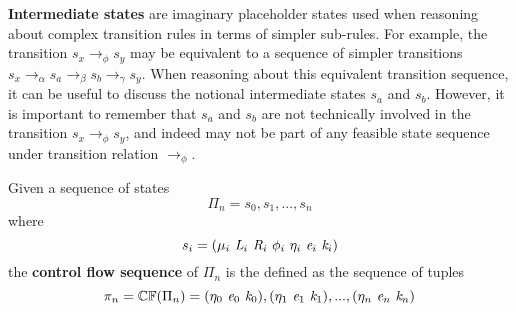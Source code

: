 \begin{definition}
\label{def:interstate}
\textbf{Intermediate states} are imaginary placeholder states used when reasoning about complex transition rules in terms of simpler sub-rules. For example, the transition $s_x \rightarrow_\phi s_y$ may be equivalent to a sequence of simpler transitions $s_x \rightarrow_\alpha s_a \rightarrow_\beta s_b \rightarrow_\gamma s_y$.  When reasoning about this equivalent transition sequence, it can be useful to discuss the notional intermediate states $s_a$ and $s_b$. However, it is important to remember that $s_a$ and $s_b$ are not technically involved in the transition $s_x \rightarrow_\phi s_y$, and indeed may not be part of any feasible state sequence under transition relation $\rightarrow_\phi$.
\end{definition}

\begin{definition}
Given a sequence of states $$\Pi_n = s_0,s_1,...,s_n$$ where $$s_i = ( \mu_i\ \cfgnt{L}_i\ \cfgnt{R}_i\ \phi_i\ \eta_i\ \cfgnt{e}_i\ \cfgnt{k}_i )$$ the \textbf{control flow sequence} of $\Pi_n$ is the defined as the sequence of tuples $$ \pi_n = \mathbb{CF}(\Pi_n) = (\eta_0\ \cfgnt{e}_0\ \cfgnt{k}_0),(\eta_1\ \cfgnt{e}_1\ \cfgnt{k}_1),...,(\eta_n\ \cfgnt{e}_n\ \cfgnt{k}_n)$$
\end{definition}


